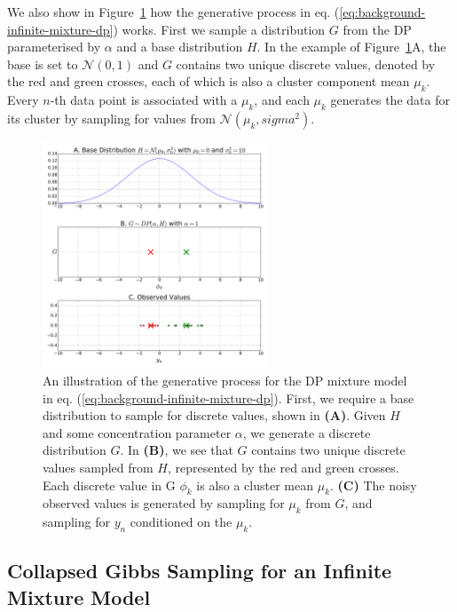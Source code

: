 We also show in Figure~\ref{fig:g-from-dp} how the generative process in eq. (\ref{eq:background-infinite-mixture-dp}) works. First we sample a distribution $G$ from the DP parameterised by $\alpha$ and a base distribution $H$. In the example of Figure~\ref{fig:g-from-dp}A, the base is set to $\mathcal{N}(0, 1)$ and $G$ contains two unique discrete values, denoted by the red and green crosses, each of which is also a cluster component mean $\mu_k$. Every $n$-th data point is associated with a $\mu_k$, and each $\mu_k$ generates the data for its cluster by sampling for values from $\mathcal{N}(\mu_k, sigma^2)$. 
\begin{figure}
\noindent \begin{centering}
\includegraphics[width=0.6\textwidth]{03-machine-learning/figures/dp_samples.pdf}
\par\end{centering}
\caption{\label{fig:g-from-dp}An illustration of the generative process for the DP mixture model in eq. (\ref{eq:background-infinite-mixture-dp}). First, we require a base distribution to sample for discrete values, shown in \textbf{(A)}. Given $H$ and some concentration parameter $\alpha$, we generate a discrete distribution $G$. In \textbf{(B)}, we see that $G$ contains two unique discrete values sampled from $H$, represented by the red and green crosses. Each discrete value in G $\phi_k$ is also a cluster mean $\mu_k$. \textbf{(C)} The noisy observed values is generated by sampling for $\mu_k$ from $G$, and sampling for $y_n$ conditioned on the $\mu_k$.}
\end{figure}

\subsection{Collapsed Gibbs Sampling for an Infinite Mixture Model}

